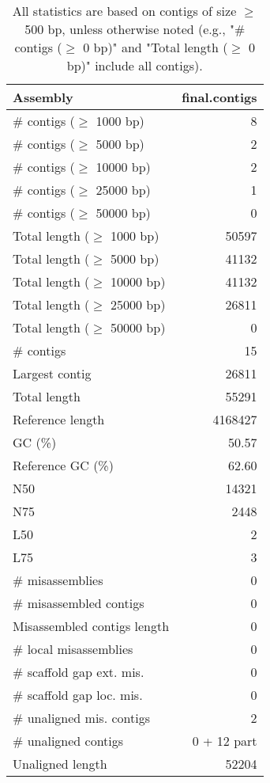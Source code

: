 \documentclass[12pt,a4paper]{article}
\begin{document}
\begin{table}[ht]
\begin{center}
\caption{All statistics are based on contigs of size $\geq$ 500 bp, unless otherwise noted (e.g., "\# contigs ($\geq$ 0 bp)" and "Total length ($\geq$ 0 bp)" include all contigs).}
\begin{tabular}{|l*{1}{|r}|}
\hline
Assembly & final.contigs \\ \hline
\# contigs ($\geq$ 1000 bp) & 8 \\ \hline
\# contigs ($\geq$ 5000 bp) & 2 \\ \hline
\# contigs ($\geq$ 10000 bp) & 2 \\ \hline
\# contigs ($\geq$ 25000 bp) & 1 \\ \hline
\# contigs ($\geq$ 50000 bp) & 0 \\ \hline
Total length ($\geq$ 1000 bp) & 50597 \\ \hline
Total length ($\geq$ 5000 bp) & 41132 \\ \hline
Total length ($\geq$ 10000 bp) & 41132 \\ \hline
Total length ($\geq$ 25000 bp) & 26811 \\ \hline
Total length ($\geq$ 50000 bp) & 0 \\ \hline
\# contigs & 15 \\ \hline
Largest contig & 26811 \\ \hline
Total length & 55291 \\ \hline
Reference length & 4168427 \\ \hline
GC (\%) & 50.57 \\ \hline
Reference GC (\%) & 62.60 \\ \hline
N50 & 14321 \\ \hline
N75 & 2448 \\ \hline
L50 & 2 \\ \hline
L75 & 3 \\ \hline
\# misassemblies & 0 \\ \hline
\# misassembled contigs & 0 \\ \hline
Misassembled contigs length & 0 \\ \hline
\# local misassemblies & 0 \\ \hline
\# scaffold gap ext. mis. & 0 \\ \hline
\# scaffold gap loc. mis. & 0 \\ \hline
\# unaligned mis. contigs & 2 \\ \hline
\# unaligned contigs & 0 + 12 part \\ \hline
Unaligned length & 52204 \\ \hline

\end{tabular}
\end{center}
\end{table}
\end{document}
